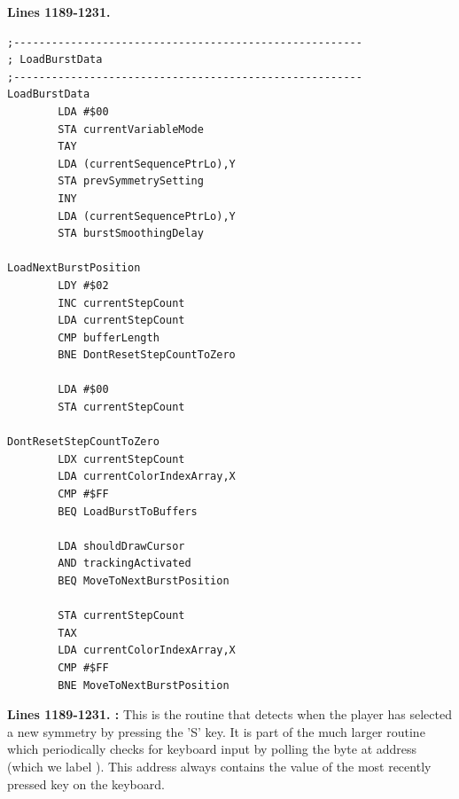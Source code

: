 \clearpage
\textbf{Lines 1189-1231. }
\begin{lstlisting}
;-------------------------------------------------------
; LoadBurstData
;-------------------------------------------------------
LoadBurstData    
        LDA #$00
        STA currentVariableMode
        TAY 
        LDA (currentSequencePtrLo),Y
        STA prevSymmetrySetting
        INY 
        LDA (currentSequencePtrLo),Y
        STA burstSmoothingDelay

LoadNextBurstPosition    
        LDY #$02
        INC currentStepCount
        LDA currentStepCount
        CMP bufferLength
        BNE DontResetStepCountToZero

        LDA #$00
        STA currentStepCount

DontResetStepCountToZero
        LDX currentStepCount
        LDA currentColorIndexArray,X
        CMP #$FF
        BEQ LoadBurstToBuffers

        LDA shouldDrawCursor
        AND trackingActivated
        BEQ MoveToNextBurstPosition

        STA currentStepCount
        TAX 
        LDA currentColorIndexArray,X
        CMP #$FF
        BNE MoveToNextBurstPosition

\end{lstlisting}
\clearpage

\textbf{Lines 1189-1231. :} This is the routine that detects when the player has selected a new
symmetry by pressing the 'S' key. It is part of the much larger routine  which periodically checks
for keyboard input by polling the byte at address  (which we label ). This address always
contains the value of the most recently pressed key on the keyboard.

